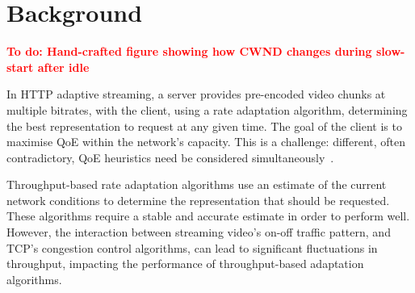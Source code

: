\documentclass[10pt,sigconf,anonymous]{acmart}
\newcommand{\todo}[1]{\textbf{\textcolor{red}{To do: #1}}}
\begin{document}


\section{Background}
\label{sec:background}

\todo{Hand-crafted figure showing how CWND changes during slow-start after idle}

In HTTP adaptive streaming, a server provides pre-encoded video chunks at multiple bitrates, with the client, using a rate adaptation algorithm, determining the best representation to request at any given time. The goal of the client is to maximise QoE within the network's capacity. This is a challenge: different, often contradictory, QoE heuristics need be considered simultaneously~\cite{Seufert-2015-A-Survey-on-QoE-Dash}. 

Throughput-based rate adaptation algorithms use an estimate of the current network conditions to determine the representation that should be requested. These algorithms require a stable and accurate estimate in order to perform well. However, the interaction between streaming video's on-off traffic pattern, and TCP's congestion control algorithms, can lead to significant fluctuations in throughput, impacting the performance of throughput-based adaptation algorithms.
\end{document}
